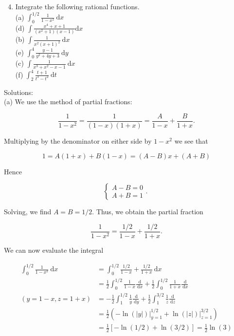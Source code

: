 \documentclass[10pt]{article}
\begin{document}
\begin{enumerate}
  \setcounter{enumi}{3}
  \item Integrate the following rational functions.\\
(a) $\int_{0}^{1 / 2} \frac{1}{1-x^{2}} \mathrm{~d} x$\\
(d) $\int \frac{x^{4}+x+1}{\left(x^{2}+1\right)(x-1)} \mathrm{d} x$\\
(b) $\int \frac{1}{x^{2}(x+1)^{2}} \mathrm{~d} x$\\
(e) $\int_{0}^{4} \frac{y-1}{y^{2}+4 y+3} \mathrm{~d} y$\\
(c) $\int \frac{1}{x^{3}+x^{2}-x-1} \mathrm{~d} x$\\
(f) $\int_{2}^{4} \frac{t+1}{t^{3}-t^{2}} \mathrm{~d} t$
\end{enumerate}

Solutions:\\
(a) We use the method of partial fractions:

$$
\frac{1}{1-x^{2}}=\frac{1}{(1-x)(1+x)}=\frac{A}{1-x}+\frac{B}{1+x} .
$$

Multiplying by the denominator on either side by $1-x^{2}$ we see that

$$
1=A(1+x)+B(1-x)=(A-B) x+(A+B)
$$

Hence

$$
\left\{\begin{array}{l}
A-B=0 \\
A+B=1
\end{array}\right. \text {. }
$$

Solving, we find $A=B=1 / 2$. Thus, we obtain the partial fraction

$$
\frac{1}{1-x^{2}}=\frac{1 / 2}{1-x}+\frac{1 / 2}{1+x} .
$$

We can now evaluate the integral

$$
\begin{aligned}
\int_{0}^{1 / 2} \frac{1}{1-x^{2}} \mathrm{~d} x & =\int_{0}^{1 / 2} \frac{1 / 2}{1-x}+\frac{1 / 2}{1+x} \mathrm{~d} x \\
& =\frac{1}{2} \int_{0}^{1 / 2} \frac{1}{1-x} \frac{\mathrm{~d}}{\mathrm{~d} x}+\frac{1}{2} \int_{0}^{1 / 2} \frac{1}{1+x} \frac{\mathrm{~d}}{\mathrm{~d} x} \\
(y=1-x, z=1+x) & =-\frac{1}{2} \int_{1}^{1 / 2} \frac{1}{y} \frac{\mathrm{~d}}{\mathrm{~d} y}+\frac{1}{2} \int_{1}^{3 / 2} \frac{1}{z} \frac{\mathrm{~d}}{\mathrm{~d} z} \\
& =\frac{1}{2}\left(-\left.\ln (|y|)\right|_{y=1} ^{1 / 2}+\left.\ln (|z|)\right|_{z=1} ^{3 / 2}\right) \\
& =\frac{1}{2}[-\ln (1 / 2)+\ln (3 / 2)]=\frac{1}{2} \ln (3)
\end{aligned}
$$
\end{document}
